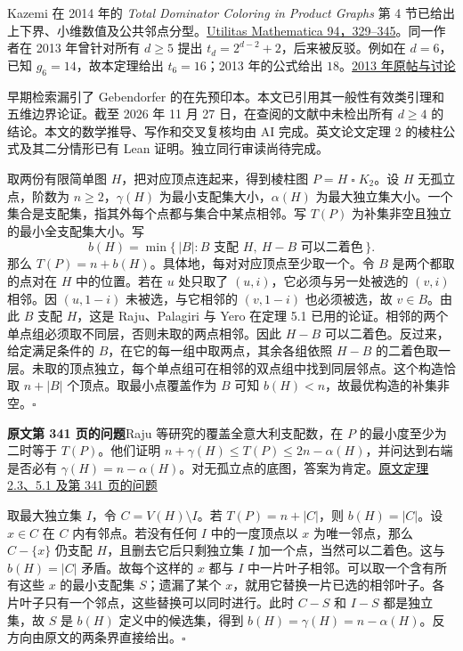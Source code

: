 \documentclass[11pt,a4paper]{article}
\newcommand{\sect}[1]{\par\vspace{4pt}{\large\sffamily\bfseries\color{accent}#1}\par}
\newcommand{\subh}[1]{\par\textbf{#1}\quad}
\newcommand{\finish}{\hfill$\square$}
\begin{document}
Kazemi 在 2014 年的 {\western\itshape Total Dominator Coloring in Product Graphs} 第 4 节已给出上下界、小维数值及公共邻点分型。\href{https://combinatorialpress.com/um/vol94/}{Utilitas Mathematica 94，329–345}。同一作者在 2013 年曾针对所有 $d\ge5$ 提出 $t_d=2^{d-2}+2$，后来被反驳。例如在 $d=6$，已知 $g_6=14$，故本定理给出 $t_6=16$；2013 年的公式给出 $18$。\href{https://www.openproblemgarden.org/op/total_dominator_chromatic_number_of_a_hypercube}{2013 年原帖与讨论}

早期检索漏引了 Gebendorfer 的在先预印本。本文已引用其一般性有效类引理和五维边界论证。截至 2026 年 11 月 27 日，在查阅的文献中未检出所有 $d\ge4$ 的结论。本文的数学推导、写作和交叉复核均由 AI 完成。英文论文定理 2 的棱柱公式及其二分情形已有 Lean 证明。独立同行审读尚待完成。

\newpage
\sect{棱柱图与一个 2024 年的公开问题}
取两份有限简单图 $H$，把对应顶点连起来，得到棱柱图 $P=H\mathbin{\square}K_2$。设 $H$ 无孤立点，阶数为 $n\ge2$，$\gamma(H)$ 为最小支配集大小，$\alpha(H)$ 为最大独立集大小。一个集合是支配集，指其外每个点都与集合中某点相邻。写 $T(P)$ 为补集非空且独立的最小全支配集大小。写
\[
 b(H)=\min\{\,|B|: B\text{ 支配 }H,\ H-B\text{ 可以二着色}\,\}.
\]
那么 $T(P)=n+b(H)$。具体地，每对对应顶点至少取一个。令 $B$ 是两个都取的点对在 $H$ 中的位置。若在 $u$ 处只取了 $(u,i)$，它必须与另一处被选的 $(v,i)$ 相邻。因 $(u,1-i)$ 未被选，与它相邻的 $(v,1-i)$ 也必须被选，故 $v\in B$。由此 $B$ 支配 $H$，这是 Raju、Palagiri 与 Yero 在定理 5.1 已用的论证。相邻的两个单点组必须取不同层，否则未取的两点相邻。因此 $H-B$ 可以二着色。反过来，给定满足条件的 $B$，在它的每一组中取两点，其余各组依照 $H-B$ 的二着色取一层。未取的顶点独立，每个单点组可在相邻的双点组中找到同层邻点。这个构造恰取 $n+|B|$ 个顶点。取最小点覆盖作为 $B$ 可知 $b(H)<n$，故最优构造的补集非空。\finish

\subh{原文第 341 页的问题}Raju 等研究的覆盖全意大利支配数，在 $P$ 的最小度至少为二时等于 $T(P)$。他们证明 $n+\gamma(H)\le T(P)\le 2n-\alpha(H)$，并问达到右端是否必有 $\gamma(H)=n-\alpha(H)$。对无孤立点的底图，答案为肯定。\href{https://doi.org/10.1016/j.dam.2024.07.017}{原文定理 2.3、5.1 及第 341 页的问题}

取最大独立集 $I$，令 $C=V(H)\setminus I$。若 $T(P)=n+|C|$，则 $b(H)=|C|$。设 $x\in C$ 在 $C$ 内有邻点。若没有任何 $I$ 中的一度顶点以 $x$ 为唯一邻点，那么 $C-\{x\}$ 仍支配 $H$，且删去它后只剩独立集 $I$ 加一个点，当然可以二着色。这与 $b(H)=|C|$ 矛盾。故每个这样的 $x$ 都与 $I$ 中一片叶子相邻。可以取一个含有所有这些 $x$ 的最小支配集 $S$；遗漏了某个 $x$，就用它替换一片已选的相邻叶子。各片叶子只有一个邻点，这些替换可以同时进行。此时 $C-S$ 和 $I-S$ 都是独立集，故 $S$ 是 $b(H)$ 定义中的候选集，得到 $b(H)=\gamma(H)=n-\alpha(H)$。反方向由原文的两条界直接给出。\finish
\end{document}
